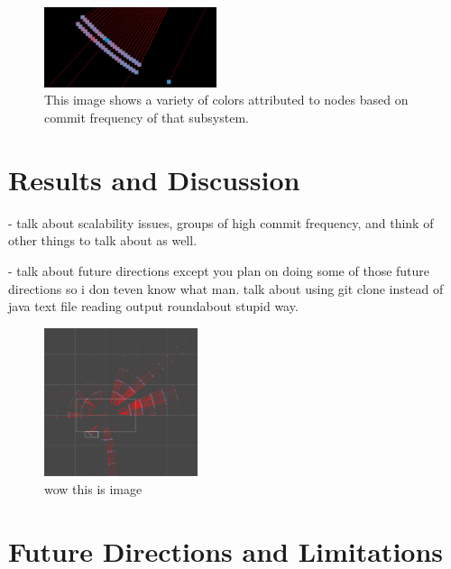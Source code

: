\documentclass[conference]{IEEEtran}
\begin{document}
\begin{figure}[h!]
	\centering
	\includegraphics[width=0.45\textwidth]{randomSection.png}
	\caption{This image shows a variety of colors attributed to nodes based on commit frequency of that subsystem.}
\end{figure}

\section{Results and Discussion}
\label{resAndDisc}

- talk about scalability issues, groups of high commit frequency, and think of other things to talk about as well.

- talk about future directions except you plan on doing some of those future directions so i don teven know what man. talk about using git clone instead of java text file reading output roundabout stupid way.

\begin{figure}[h!]
	\centering
	\includegraphics[width=0.4\textwidth]{wholeThingMostly.png}
	\caption{wow this is image}
\end{figure}

\section{Future Directions and Limitations}
\label{futDir}





\vspace{12pt}
\end{document}
